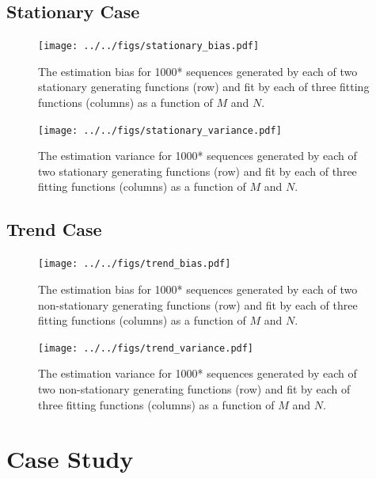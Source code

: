 \documentclass[12pt]{article}
\begin{document}
\subsection{Stationary Case}

\begin{figure}[ht]
  \texttt{[image: ../../figs/stationary\_bias.pdf]}
  \caption{The estimation bias for 1000* sequences generated by each of two stationary generating functions (row) and fit by each of three fitting functions (columns) as a function of \(M\) and \(N\).\label{fig:stationary-bias}}
\end{figure}

\begin{figure}[ht]
  \texttt{[image: ../../figs/stationary\_variance.pdf]}
  \caption{The estimation variance for 1000* sequences generated by each of two stationary generating functions (row) and fit by each of three fitting functions (columns) as a function of \(M\) and \(N\).\label{fig:stationary-bias}}
\end{figure}


\subsection{Trend Case}

\begin{figure}[ht]
  \texttt{[image: ../../figs/trend\_bias.pdf]}
  \caption{The estimation bias for 1000* sequences generated by each of two non-stationary generating functions (row) and fit by each of three fitting functions (columns) as a function of \(M\) and \(N\).\label{fig:stationary-bias}}
\end{figure}

\begin{figure}[ht]
  \texttt{[image: ../../figs/trend\_variance.pdf]}
  \caption{The estimation variance for 1000* sequences generated by each of two non-stationary generating functions (row) and fit by each of three fitting functions (columns) as a function of \(M\) and \(N\).\label{fig:stationary-bias}}
\end{figure}

\section{Case Study}
\end{document}
